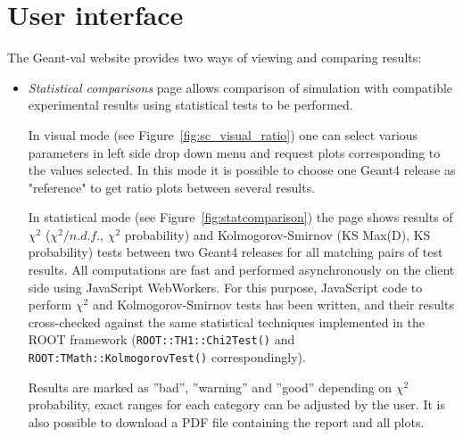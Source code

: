 \section{User interface}
\label{sec-analyse}

The \textsf{Geant-val} website provides two ways of viewing and comparing results:

\begin{itemize}



\item \textit{Statistical comparisons} page allows comparison of simulation with compatible experimental results using statistical tests to be performed. %

In visual mode  (see Figure~\ref{fig:sc_visual_ratio}) one can select various parameters in left side drop down menu and request plots corresponding to the values selected. In this mode it is possible to choose one Geant4 release as "reference" to get ratio plots between several results.

In statistical mode (see Figure~\ref{fig:statcomparison}) the page shows results of $\chi^2$ ($\chi^2/n.d.f.$, $\chi^2$ probability) and Kolmogorov-Smirnov (KS Max(D), KS probability) tests between two Geant4 releases for all matching pairs of test results.
All computations are fast and performed asynchronously on the client side using JavaScript WebWorkers. For this purpose, JavaScript code to perform $\chi^2$ and Kolmogorov-Smirnov tests has been written, and their results cross-checked against the same statistical techniques implemented in the ROOT framework ({\tt ROOT::TH1::Chi2Test()} and {\tt ROOT:TMath::KolmogorovTest()} correspondingly).

Results are marked as ''bad'', ''warning'' and ''good'' depending on $\chi^2$ probability, exact ranges for each category can be adjusted by the user. It is also possible to download a PDF file containing the report and all plots.


\end{itemize}
